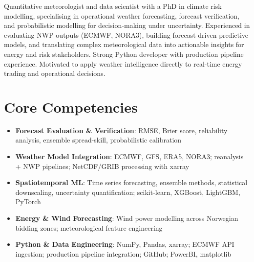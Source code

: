\documentclass[11pt,a4paper,sans]{moderncv}
\begin{document}
\makecvtitle


\vspace{6pt}
\small{Quantitative meteorologist and data scientist with a PhD in climate risk modelling, specialising in operational weather forecasting, forecast verification, and probabilistic modelling for decision-making under uncertainty. Experienced in evaluating NWP outputs (ECMWF, NORA3), building forecast-driven predictive models, and translating complex meteorological data into actionable insights for energy and risk stakeholders. Strong Python developer with production pipeline experience. Motivated to apply weather intelligence directly to real-time energy trading and operational decisions.}


\section{Core Competencies}
\vspace{1pt}
\begin{itemize}

\item \textbf{Forecast Evaluation \& Verification}: RMSE, Brier score, reliability analysis, ensemble spread-skill, probabilistic calibration

\item \textbf{Weather Model Integration}: ECMWF, GFS, ERA5, NORA3; reanalysis + NWP pipelines; NetCDF/GRIB processing with xarray

\item \textbf{Spatiotemporal ML}: Time series forecasting, ensemble methods, statistical downscaling, uncertainty quantification; scikit-learn, XGBoost, LightGBM, PyTorch

\item \textbf{Energy \& Wind Forecasting}: Wind power modelling across Norwegian bidding zones; meteorological feature engineering

\item \textbf{Python \& Data Engineering}: NumPy, Pandas, xarray; ECMWF API ingestion; production pipeline integration; GitHub; PowerBI, matplotlib

\end{itemize}
\end{document}

